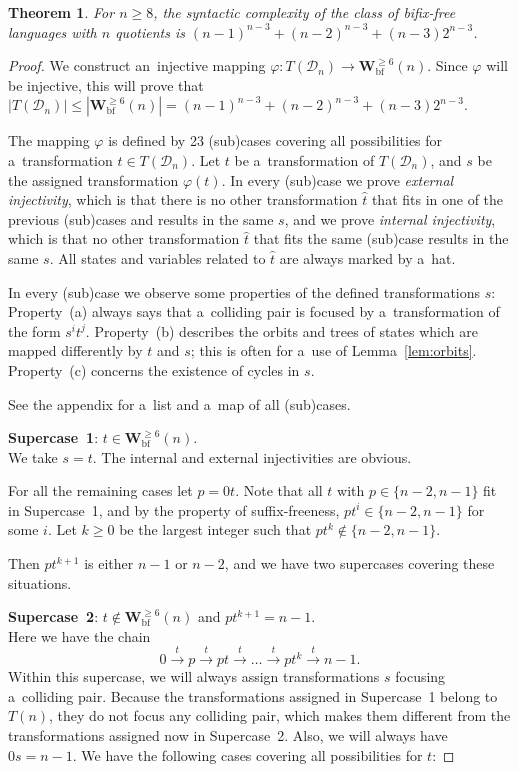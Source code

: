\documentclass{amsart}
\newtheorem{theorem}{Theorem}
\renewcommand{\le}{\leqslant}
\renewcommand{\ge}{\geqslant}
\newcommand{\Wbf}{\mathbf{W}^{\ge 6}_{\mathrm{bf}}}
\newcommand{\e}[1]{\hat{#1}}
\newcommand{\cD}{{\mathcal D}}
\begin{document}
\begin{theorem}\label{thm:bifix-free_upper_bound}
For $n\ge 8$, the syntactic complexity of the class of bifix-free languages with $n$ quotients is $(n-1)^{n-3}+(n-2)^{n-3}+(n-3)2^{n-3}$.
\end{theorem}
\begin{proof}
We construct an~injective mapping $\varphi \colon T(\cD_n) \to \Wbf(n)$.
Since $\varphi$ will be injective, this will prove that $|T(\cD_n)| \le |\Wbf(n)| = (n-1)^{n-3}+(n-2)^{n-3}+(n-3)2^{n-3}$.

The mapping $\varphi$ is defined by 23 (sub)cases covering all possibilities for a~transformation $t \in T(\cD_n)$.
Let $t$ be a~transformation of $T(\cD_n)$, and $s$ be the assigned transformation $\varphi(t)$.
In every (sub)case we prove \emph{external injectivity}, which is that there is no other
transformation $\e{t}$ that fits in one of the previous (sub)cases and results in the same $s$, and
we prove \emph{internal injectivity}, which is that no other transformation $\e{t}$ that fits  the same (sub)case results in the same $s$.
All states and variables related to $\e{t}$ are always marked by a~hat.

In every (sub)case we observe some properties of the defined transformations $s$:
Property~(a) always says that a~colliding pair is focused by a~transformation of the form $s^i t^j$.
Property~(b) describes the orbits and trees of states which are mapped differently by $t$ and $s$; this is often for a~use of Lemma~\ref{lem:orbits}.
Property~(c) concerns the existence of cycles in $s$.

See the appendix for a~list and a~map of all (sub)cases.

\textbf{Supercase~1}: $t \in \Wbf(n)$.\\
We take $s = t$.
The internal and external injectivities are obvious.

\noindent For all the remaining cases let $p = 0t$.
Note that all $t$ with $p \in \{n-2,n-1\}$ fit in Supercase~1, and by the property of suffix-freeness, $pt^i \in \{n-2,n-1\}$ for some $i$.
Let $k \ge 0$ be the largest integer such that $pt^k \notin \{n-2,n-1\}$.

Then $pt^{k+1}$ is either $n-1$ or $n-2$, and we have two supercases covering these situations.

\textbf{Supercase~2}: $t \notin \Wbf(n)$ and $pt^{k+1} = n-1$.\\
Here we have the chain
$$0 \stackrel{t}{\rightarrow} p \stackrel{t}{\rightarrow} pt \stackrel{t}{\rightarrow} \dots \stackrel{t}{\rightarrow} pt^k \stackrel{t}{\rightarrow} n-1.$$
Within this supercase, we will always assign transformations $s$ focusing a~colliding pair.
Because the transformations assigned in Supercase~1 belong to $T(n)$, they do not focus any colliding pair, which makes them different from the transformations assigned now in Supercase~2.
Also, we will always have $0 s = n-1$.
We have the following cases covering all possibilities for $t$:


\end{proof}
\end{document}
